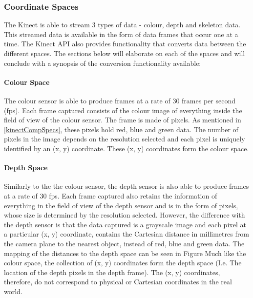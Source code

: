 \subsubsection{Coordinate Spaces} \label{kinectCoordinateSpaces}
The Kinect is able to stream 3 types of data - colour, depth and skeleton data. This streamed data is available in the form of data frames that occur one at a time. The Kinect API also provides functionality that converts data between the different spaces. \cite{msdnCoSpaces2017} The sections below will elaborate on each of the spaces and will conclude with a synopsis of the conversion functionality available:

\paragraph{Colour Space}
The colour sensor is able to produce frames at a rate of 30 frames per second (fps). \cite{msdnKinectSpecs2017} Each frame captured consists of the colour image of everything inside the field of view of the colour sensor. The frame is made of pixels. As mentioned in \ref{kinectCompSpecs}, these pixels hold red, blue and green data. The number of pixels in the image depends on the resolution selected and each pixel is uniquely identified by an (x, y) coordinate. These (x, y) coordinates form the colour space. \cite{msdnCoSpaces2017}

\paragraph{Depth Space}
Similarly to the the colour sensor, the depth sensor is also able to produce frames at a rate of 30 fps. \cite{msdnKinectSpecs2017} Each frame captured also retains the information of everything in the field of view of the depth sensor and is in the form of pixels, whose size is determined by the resolution selected.  However, the difference with the depth sensor is that the data captured is a grayscale image and each pixel at a particular (x, y) coordinate, contains the Cartesian distance in millimetres from the camera plane to the nearest object, instead of red, blue and green data. The mapping of the distances to the depth space can be seen in Figure Much like the colour space, the collection of (x, y) coordinates form the depth space (I.e. The location of the depth pixels in the depth frame). The (x, y) coordinates, therefore, do not correspond to physical or Cartesian coordinates in the real world. \cite{msdnCoSpaces2017}

